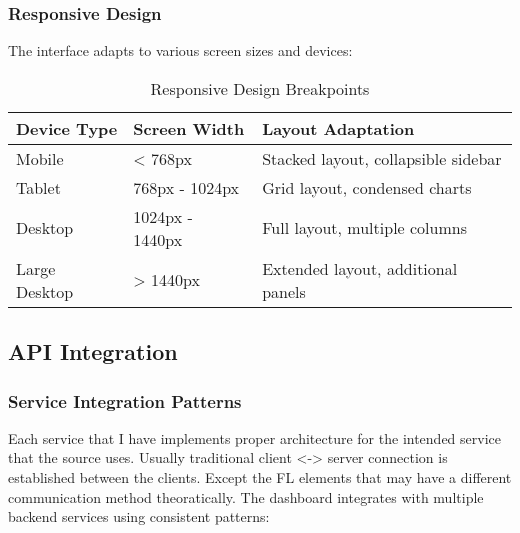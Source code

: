 \subsubsection{Responsive Design}

The interface adapts to various screen sizes and devices:

\begin{table}[H]
\centering
\caption{Responsive Design Breakpoints}
\label{tab:responsive-breakpoints}
\begin{tabular}{@{}lll@{}}
\toprule
\textbf{Device Type} & \textbf{Screen Width} & \textbf{Layout Adaptation} \\
\midrule
Mobile & < 768px & Stacked layout, collapsible sidebar \\
Tablet & 768px - 1024px & Grid layout, condensed charts \\
Desktop & 1024px - 1440px & Full layout, multiple columns \\
Large Desktop & > 1440px & Extended layout, additional panels \\
\bottomrule
\end{tabular}
\end{table}

\subsection{API Integration}

\subsubsection{Service Integration Patterns}

Each service that I have implements proper architecture for the intended service that the source uses. Usually traditional client <-> server connection is established between the clients. Except the FL elements that may have a different communication method theoratically. The dashboard integrates with multiple backend services using consistent patterns:

